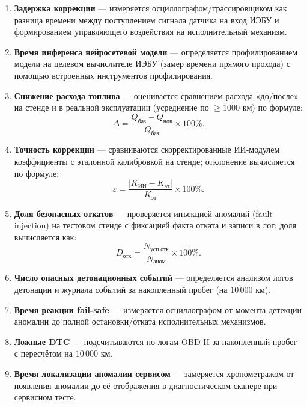 \documentclass[14pt, a4paper]{extarticle}
\begin{document}
			\begin{enumerate}
				\item \textbf{Задержка коррекции} --- измеряется осциллографом/трассировщиком как разница времени между поступлением сигнала датчика на вход ИЭБУ и формированием управляющего воздействия на исполнительный механизм.
				
				\item \textbf{Время инференса нейросетевой модели} --- определяется профилированием модели на целевом вычислителе ИЭБУ (замер времени прямого прохода) с помощью встроенных инструментов профилирования.
				
				\item \textbf{Снижение расхода топлива} --- оценивается сравнением расхода «до/после» на стенде и в реальной эксплуатации (усреднение по \(\geq 1000\) км) по формуле:
				\[
				\Delta = \frac{Q_{\text{баз}} - Q_{\text{нов}}}{Q_{\text{баз}}} \times 100\%.
				\]
				
				\item \textbf{Точность коррекции} --- сравниваются скорректированные ИИ-модулем коэффициенты с эталонной калибровкой на стенде; отклонение вычисляется по формуле:
				\[
				\varepsilon = \frac{|K_{\text{ИИ}} - K_{\text{эт}}|}{K_{\text{эт}}} \times 100\%.
				\]
				
				\item \textbf{Доля безопасных откатов} --- проверяется инъекцией аномалий (fault injection) на тестовом стенде с фиксацией факта отката и записи в лог; доля вычисляется как:
				\[
				D_{\text{отк}} = \frac{N_{\text{усп.отк}}}{N_{\text{аном}}} \times 100\%.
				\]
				
				\item \textbf{Число опасных детонационных событий} --- определяется анализом логов детонации и журнала событий за накопленный пробег (на \(10\,000\) км).
				
				\item \textbf{Время реакции fail-safe} --- измеряется осциллографом от момента детекции аномалии до полной остановки/отката исполнительных механизмов.
				
				\item \textbf{Ложные DTC} --- подсчитываются по логам OBD-II за накопленный пробег с пересчётом на \(10\,000\) км.
				
				\item \textbf{Время локализации аномалии сервисом} --- замеряется хронометражом от появления аномалии до её отображения в диагностическом сканере при сервисном тесте.
				

\end{enumerate}
\end{document}
